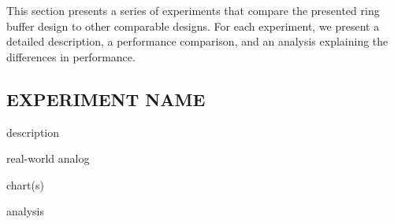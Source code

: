 
This section presents a series of experiments that compare the presented ring buffer design to other comparable designs.
For each experiment, we present a detailed description, a performance comparison, and an analysis explaining the differences in performance.

\subsection{EXPERIMENT NAME}
description

real-world analog

chart(s)

analysis